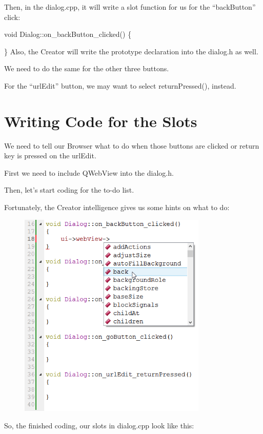Then, in the dialog.cpp, it will write a slot function for us for the
``backButton'' click:

void Dialog::on\_backButton\_clicked() \{

\} Also, the Creator will write the prototype declaration into the
dialog.h as well.

We need to do the same for the other three buttons.

For the ``urlEdit'' button, we may want to select returnPressed(),
instead.

\section{Writing Code for the
Slots}\label{writing-code-for-the-slots}

We need to tell our Browser what to do when those buttons are clicked or
return key is pressed on the urlEdit.

First we need to include QWebView into the dialog.h.

Then, let's start coding for the to-do list.

Fortunately, the Creator intelligence gives us some hints on what to do:

\begin{figure}[htbp]
\centering
\includegraphics[width=0.8\textwidth]{images/BackButtonCoding.png}
\caption{}
\end{figure}

So, the finished coding, our slots in dialog.cpp look like this:


